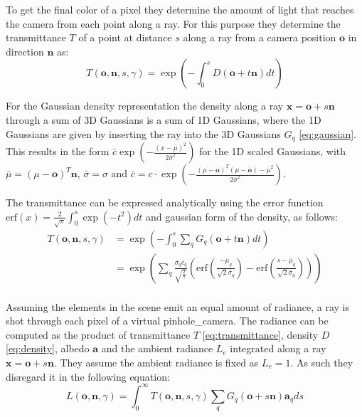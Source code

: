 \documentclass[a4paper, 11pt]{memoir}
\newcommand*{\erf}{\text{erf}}
\begin{document}
    To get the final color of a pixel they determine the amount of light that reaches the camera from each point
    along a ray. For this purpose they determine the \gls{transmittance} $T$ of a point at distance $s$ along a ray from
    a camera position $\mathbf{o}$ in direction $\mathbf{n}$ as:
    \begin{equation}
        T(\mathbf{o}, \mathbf{n}, s, \gamma) = \exp{\left( - \int_0^s D(\mathbf{o} + t\mathbf{n}) dt \right)}
        \label{eq:transmittance}
    \end{equation}

    For the Gaussian density representation the density along a ray $\mathbf{x} = \mathbf{o} + s\mathbf{n}$ through a
    sum of 3D Gaussians is a sum of 1D Gaussians, where the 1D Gaussians are given by inserting the ray into the
    3D Gaussians $G_q$ \eqref{eq:gaussian}. This results in the form
    $\bar{c} \exp{\left( - \frac{(x - \bar{\mu})^2}{2\bar{\sigma}^2} \right)}$ for the 1D scaled Gaussians, with
    $\bar{\mu} = (\mu - \mathbf{o})^T\mathbf{n}$, $\bar{\sigma} = \sigma$ and
    $\bar{c} = c \cdot \exp{\left( - \frac{(\mu - \mathbf{o})^T(\mu - \mathbf{o}) - \bar{\mu}^2}{2\bar{\sigma}^2} \right)}$.

    The \gls{transmittance} can be expressed analytically using the error function
    $\erf{(x)} = \frac{2}{\sqrt{\pi}}\int_0^s \exp{(-t^2)} dt$ and gaussian form of the density, as follows:
    \begin{equation}
        \begin{aligned}
            T(\mathbf{o}, \mathbf{n}, s, \gamma) &= \exp{\left( -\int_0^s
                \sum_q G_q(\mathbf{o} + t\mathbf{n} ) dt \right)}\\
            &= \exp{\left( \sum_q \frac{\bar{\sigma}_q \bar{c}_q}{\sqrt{\frac{2}{\pi}}}
            \left( \erf{\left( \frac{-\bar{\mu}_q}{\sqrt{2}\bar{\sigma}_q} \right)}
            - \erf{\left( \frac{s - \bar{\mu}_q}{\sqrt{2}\bar{\sigma}_q} \right)} \right) \right)}\\
        \end{aligned}
        \label{eq:transmittance_analytical}
    \end{equation}

    Assuming the elements in the scene emit an equal amount of \gls{radiance}, a ray is shot through each pixel of a virtual
    \gls{pinhole_camera}. The \gls{radiance} can be computed as the product of \gls{transmittance} $T$ \eqref{eq:transmittance},
    density $D$ \eqref{eq:density}, \gls{albedo} $\mathbf{a}$ and the ambient \gls{radiance} $L_e$ integrated along a ray
    $\mathbf{x} = \mathbf{o} + s\mathbf{n}$. They assume the ambient \gls{radiance} is fixed as $L_e = 1$. As such they
    disregard it in the following equation:
    \begin{equation}
        L(\mathbf{o}, \mathbf{n}, \gamma) = \int_0^\infty T(\mathbf{o}, \mathbf{n}, s, \gamma)
            \sum_q G_q(\mathbf{o} + s\mathbf{n})\mathbf{a}_q ds
    \end{equation}
    
\end{document}

